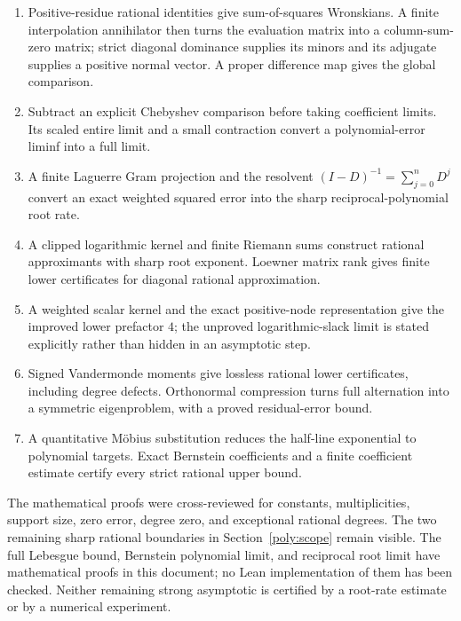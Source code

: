 \documentclass[11pt]{article}
\theoremstyle{remark}
\numberwithin{equation}{section}
\begin{document}
\begin{enumerate}
\item Positive-residue rational identities give sum-of-squares
Wronskians. A finite interpolation annihilator then turns the
evaluation matrix into a column-sum-zero matrix; strict diagonal
dominance supplies its minors and its adjugate supplies a positive
normal vector. A proper difference map gives the global comparison.
\item Subtract an explicit Chebyshev comparison before taking
coefficient limits. Its scaled entire limit and a small contraction
convert a polynomial-error liminf into a full limit.
\item A finite Laguerre Gram projection and the resolvent
$(I-D)^{-1}=\sum_{j=0}^nD^j$ convert an exact weighted squared error
into the sharp reciprocal-polynomial root rate.
\item A clipped logarithmic kernel and finite Riemann sums construct
rational approximants with sharp root exponent. Loewner matrix rank
gives finite lower certificates for diagonal rational approximation.
\item A weighted scalar kernel and the exact positive-node representation
give the improved lower prefactor $4$; the unproved logarithmic-slack
limit is stated explicitly rather than hidden in an asymptotic step.
\item Signed Vandermonde moments give lossless rational lower certificates,
including degree defects.  Orthonormal compression turns full alternation
into a symmetric eigenproblem, with a proved residual-error bound.
\item A quantitative M\"obius substitution reduces the half-line
exponential to polynomial targets.  Exact Bernstein coefficients and a
finite coefficient estimate certify every strict rational upper bound.
\end{enumerate}
The mathematical proofs were cross-reviewed for constants, multiplicities,
support size, zero error, degree zero, and exceptional rational degrees.
The two remaining sharp rational boundaries in
Section~\ref{poly:scope} remain visible. The full Lebesgue bound,
Bernstein polynomial limit, and reciprocal root limit have mathematical
proofs in this document; no Lean implementation of them has been checked.
Neither remaining strong asymptotic is certified by a root-rate estimate
or by a numerical experiment.
\end{document}
